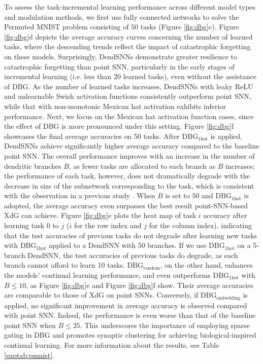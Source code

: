 To assess the task-incremental learning performance across different model types and modulation methods, we first use fully connected networks to solve the Permuted MNIST problem \cite{goodfellow2013empirical,masse2018xdg} consisting of $50$ tasks (Figure \ref{fig:dbg}c). Figure \ref{fig:dbg}d depicts the average accuracy curves concerning the number of learned tasks, where the descending trends reflect the impact of catastrophic forgetting on these models. Surprisingly, DendSNNs demonstrate greater resilience to catastrophic forgetting than point SNN, particularly in the early stages of incremental learning (i.e. less than 20 learned tasks), even without the assistance of DBG. As the number of learned tasks increases, DendSNNs with leaky ReLU and unlearnable Swish \cite{ramachandran2017swish} activation functions consistently outperform point SNN, while that with non-monotonic Mexican hat activation exhibits inferior performance. Next, we focus on the Mexican hat activation function cases, since the effect of DBG is more pronounced under this setting. Figure \ref{fig:dbg}f showcases the final average accuracies on 50 tasks. After $\mathrm{DBG}_{\mathrm{1hot}}$ is applied, DendSNNs achieve significantly higher average accuracy compared to the baseline point SNN. The overall performance improves with an increase in the number of dendritic branches $B$, as fewer tasks are allocated to each branch as $B$ increases; the performance of each task, however, does not dramatically degrade with the decrease in size of the subnetwork corresponding to the task, which is consistent with the observation in a previous study \cite{kim2022lottery}. When $B$ is set to $50$ and $\mathrm{DBG}_{\mathrm{1hot}}$ is adopted, the average accuracy even surpasses the best result point-SNN-based XdG \cite{masse2018xdg} can achieve. Figure \ref{fig:dbg}e plots the heat map of task $i$ accuracy after learning task $0$ to $j$ ($i$ for the row index and $j$ for the column index), indicating that the test accuracies of previous tasks do not degrade after learning new tasks with $\mathrm{DBG}_{\mathrm{1hot}}$ applied to a DendSNN with $50$ branches. If we use $\mathrm{DBG}_{\mathrm{1hot}}$ on a 5-branch DendSNN, the test accuracies of previous tasks do degrade, as each branch cannot afford to learn 10 tasks. $\mathrm{DBG}_{\mathrm{random}}$, on the other hand, enhances the models' continual learning performance, and even outperforms $\mathrm{DBG}_{\mathrm{1hot}}$ with $B \le 10$, as Figure \ref{fig:dbg}e and Figure \ref{fig:dbg}f show. Their average accuracies are comparable to those of XdG on point SNNs. Conversely, if $\mathrm{DBG}_{\mathrm{embedding}}$ is applied, no significant improvement in average accuracy is observed compared with point SNN. Indeed, the performance is even worse than that of the baseline point SNN when $B\le 25$. This underscores the importance of employing sparse gating in DBG and promotes synaptic clustering for achieving biological-inspired continual learning. For more information about the results, see Table \ref{suptab:pmnist}.

